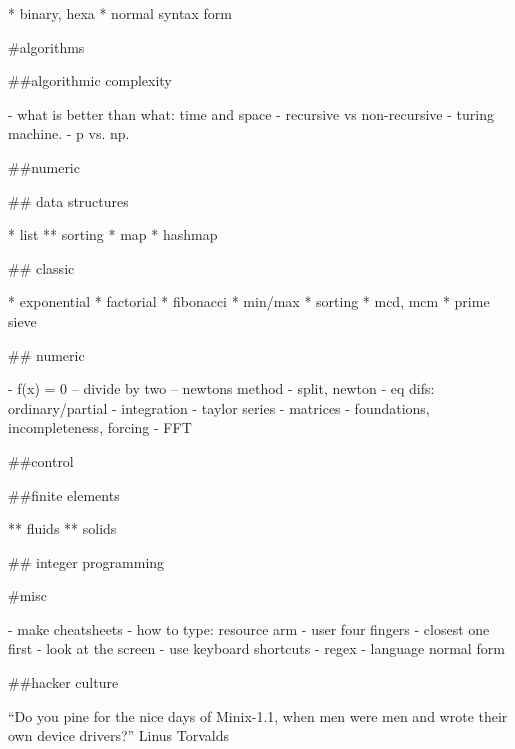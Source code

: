 * binary, hexa
* normal syntax form

#algorithms

##algorithmic complexity

- what is better than what: time and space
- recursive vs non-recursive
- turing machine.
- p vs. np.

##numeric

## data structures

* list
** sorting
* map
* hashmap

## classic

* exponential
* factorial
* fibonacci
* min/max
* sorting
* mcd, mcm
* prime sieve

## numeric

- f(x) = 0
-- divide by two
-- newtons method
- split, newton
- eq difs: ordinary/partial
- integration
- taylor series
- matrices
- foundations, incompleteness, forcing
- FFT

##control

##finite elements

** fluids
** solids

## integer programming

#misc

- make cheatsheets
- how to type: resource arm
  - user four fingers
  - closest one first
  - look at the screen
- use keyboard shortcuts
- regex
- language normal form

##hacker culture

“Do you pine for the nice days of Minix-1.1, when men were men and wrote their own device drivers?” Linus Torvalds
